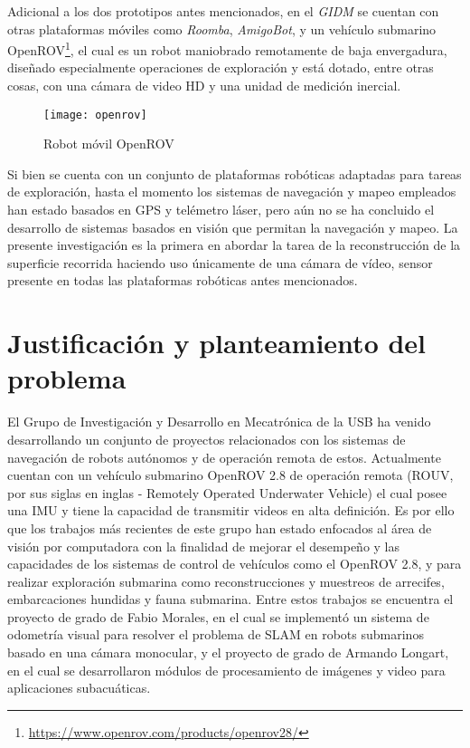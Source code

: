 Adicional a los dos prototipos antes mencionados, en el \textit{GIDM} se cuentan con otras plataformas móviles como \textit{Roomba}, \textit{AmigoBot}, y un vehículo submarino OpenROV\footnote{ \url{https://www.openrov.com/products/openrov28/}}, el cual es un robot maniobrado remotamente de baja envergadura, diseñado especialmente operaciones de exploración y está dotado, entre otras cosas, con una cámara de video HD y una unidad de medición inercial.

\begin{figure}[H]
	\centering
	\texttt{[image: openrov]}
	\caption{Robot móvil OpenROV}
	\label{imagen:openrov}
\end{figure}

Si bien se cuenta con un conjunto de plataformas robóticas adaptadas para tareas de exploración, hasta el momento los sistemas de navegación y mapeo empleados han estado basados en GPS y telémetro láser, pero aún no se ha concluido el desarrollo de sistemas basados en visión que permitan la navegación y mapeo. La presente investigación es la primera en abordar la tarea de la reconstrucción de la superficie recorrida haciendo uso únicamente de una cámara de vídeo, sensor presente en todas las plataformas robóticas antes mencionados.

\section{Justificación y planteamiento del problema}

El Grupo de Investigación y Desarrollo en Mecatrónica de la USB ha venido desarrollando un conjunto de proyectos relacionados con los sistemas de navegación de robots autónomos y de operación remota de estos. Actualmente cuentan con un vehículo submarino OpenROV 2.8 de operación remota (ROUV, por sus siglas en inglas - Remotely Operated Underwater Vehicle) el cual posee una IMU y tiene la capacidad de transmitir videos en alta definición. Es por ello que los trabajos más recientes de este grupo han estado enfocados al área de visión por computadora con la finalidad de mejorar el desempeño y las capacidades de los sistemas de control de vehículos como el OpenROV 2.8, y para realizar exploración submarina como reconstrucciones y muestreos de arrecifes, embarcaciones hundidas y fauna submarina. Entre estos trabajos se encuentra el proyecto de grado de Fabio Morales, en el cual se implementó un sistema de odometría visual para resolver el problema de SLAM en robots submarinos basado en una cámara monocular, y el proyecto de grado de  Armando Longart, en el cual se desarrollaron módulos de procesamiento de imágenes y video para aplicaciones subacuáticas.

